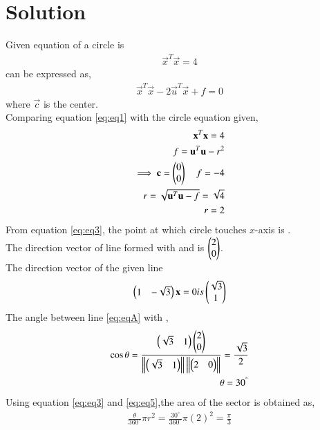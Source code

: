 \documentclass[journal,12pt,twocolumn]{IEEEtran}
\newcommand{\norm}[1]{\left\lVert#1\right\rVert}
\begin{document}
\section{Solution}
Given equation of a circle is 
    \begin{align}
        \vec{x}^{T} \vec{x} =4 \label{eq:A}
    \end{align}
can be expressed as,
\begin{align}
    \vec{x}^{T}\vec{x} - 2\vec{u}^{T}\vec{x} +f=0 \label{eq:eq1}
\end{align}
where $\vec{c}$ is the center.\\
Comparing equation \eqref{eq:eq1} with the circle equation given,
\begin{align}
    \mathbf{x}^{T}\mathbf{x} =4 \label{eq:eq2}\\
    \quad f = \mathbf{u}^T \mathbf{u}-r^2 \\
    \implies \mathbf{c} = \begin{pmatrix}0\\0\end{pmatrix} \quad f=-4\\
    r=\sqrt{\mathbf{u}^{T}\mathbf{u}-f} = \sqrt{4}\\
    r=2 \label{eq:eq3}
\end{align}
From equation \eqref{eq:eq3}, the point at which circle touches $x$-axis is .\\
The direction vector of line formed with  and  is  $\begin{pmatrix}2\\0\end{pmatrix}$.\\
The direction vector of the given line 
\begin{align}
    \begin{pmatrix}1&-\sqrt{3}\end{pmatrix}\mathbf{x}=0 is \begin{pmatrix}\sqrt{3}\\1\end{pmatrix} \label{eq:eqA}
\end{align}
The angle between line \eqref{eq:eqA} with  ,
\begin{align}
    \cos\theta = \frac{\myvec{\sqrt{3}&1}\myvec{2\\0}}{\norm{\myvec{\sqrt{3}&1}}\norm{\myvec{2&0}}}=\frac{\sqrt{3}}{2} \label{eq:solutions/7/eq:eq4}\\
    \theta = 30^{\degree}\label{eq:eq5}
\end{align}
Using equation \eqref{eq:eq3} and \eqref{eq:eq5},the area of the sector is obtained as,
\begin{align}
    \frac{\theta}{360^{\circ}}\pi r^2 = \frac{30^{\circ}}{360^{\circ}}\pi (2)^2=\frac{\pi}{3} \label{eq:eq6}
\end{align}
\end{document}
